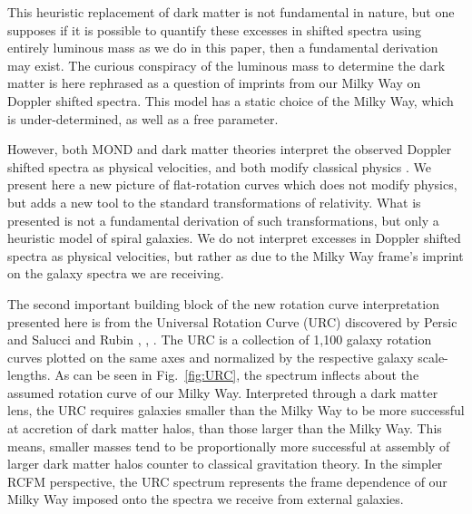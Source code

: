\documentclass[reprint,%
 amsmath,amssymb,
 aps,
]{revtex4-1}
\begin{document}
{\color{red} This heuristic replacement of dark matter is not fundamental in nature, but    one supposes if it is possible to quantify these
excesses in shifted spectra using entirely luminous mass as we do in this paper,  then a   fundamental derivation may exist.  The curious conspiracy of the luminous mass to   determine the dark matter  is here rephrased as a question of imprints from our Milky Way on Doppler shifted spectra.  This model has a static choice of the Milky Way, which is under-determined, as well as a free parameter.  
 }
 
 

  
 
   
However, both MOND and dark matter theories interpret the observed Doppler shifted spectra as physical velocities, and both modify classical physics \cite{de_Blok_2010}.   
We   present here a new picture of flat-rotation curves which does not   modify physics, but adds a new tool to the standard transformations of   relativity. 
What is presented is not a fundamental derivation of such transformations, but only a heuristic model   of spiral galaxies. 
We do not interpret excesses in Doppler shifted spectra as physical velocities, but rather as due to the Milky Way frame's imprint on the galaxy spectra we are receiving. 
 
 
 The second important building block of the new rotation curve interpretation  presented here   is from      the Universal Rotation Curve (URC) discovered by   Persic and Salucci and Rubin \cite{salucci}, \cite{Persic},  \cite{1978Rubin}.  The URC is  a collection of  1,100 galaxy rotation curves   plotted on the same   axes  and normalized by the  respective galaxy scale-lengths.  As can be seen   in Fig.~\ref{fig:URC},    
 the spectrum   inflects about   the assumed rotation curve of our   Milky Way.  Interpreted through a dark matter lens, the URC requires  
   galaxies smaller than the Milky Way to be more successful at accretion of    dark matter halos, than those    larger than the Milky Way.
   This means,  smaller masses tend to be   proportionally more successful at assembly of  larger dark matter halos counter to    classical gravitation theory.    In the simpler RCFM perspective,  the URC spectrum    represents the frame dependence of our Milky Way imposed onto the spectra  we receive  from external galaxies.  
 
\end{document}
